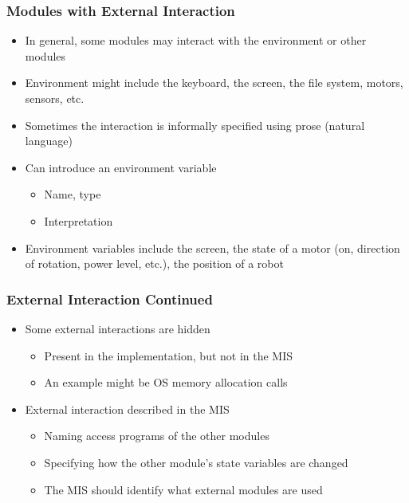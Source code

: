\documentclass[t,12pt,numbers,fleqn,handout]{beamer}
\begin{document}

\begin{frame}
\frametitle{Modules with External Interaction}

\begin{itemize}
\item In general, some modules may interact with the environment or other modules
\item Environment might include the keyboard, the screen, the file system, motors, sensors, etc.
\item Sometimes the interaction is informally specified using prose (natural language)
\item Can introduce an environment variable
\begin{itemize}
\item Name, type
\item Interpretation
\end{itemize}
\item Environment variables include the screen, the state of a motor (on, direction of rotation, power level, etc.),
the position of a robot

\end{itemize}

\end{frame}


\begin{frame}
\frametitle{External Interaction Continued}

\begin{itemize}
\item Some external interactions are hidden
\begin{itemize}
\item Present in the implementation, but not in the MIS
\item An example might be OS memory allocation calls
\end{itemize}
\item External interaction described in the MIS
\begin{itemize}
\item Naming access programs of the other modules
\item Specifying how the other module's state variables are changed
\item The MIS should identify what external modules are used
\end{itemize}
\end{itemize}

\end{frame}
\end{document}
